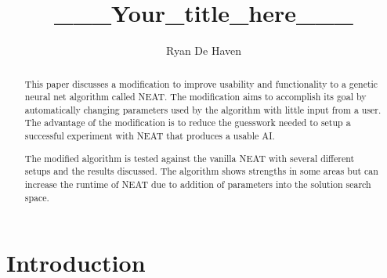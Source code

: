 \documentclass[12pt]{ucthesis} \newif\ifpdf \ifx\pdfoutput\undefined
\begin{document}
\title{___Your_title_here___}

\author{Ryan De Haven}
  
 
      


\maketitle

\begin{frontmatter}

\copyrightpage

\approvalpage

 
\begin{abstract}
This paper discusses a modification to improve usability and functionality to a
genetic neural net algorithm called NEAT. The modification aims to accomplish
its goal by automatically changing parameters used by the algorithm with little
input from a user. The advantage of the modification is to reduce the guesswork
needed to setup a successful experiment with NEAT that produces a usable AI.

The modified algorithm is tested against the vanilla NEAT with several different
setups and the results discussed. The algorithm shows strengths in some areas
but can increase the runtime of NEAT due to addition of parameters into the
solution search space.

\end{abstract}

\begin{acknowledgements}

\end{acknowledgements}

\tableofcontents

\listoftables

\listoffigures

\end{frontmatter}

\pagestyle{plain}

\renewcommand{\baselinestretch}{1.66}


\chapter{Introduction}
\end{document}
